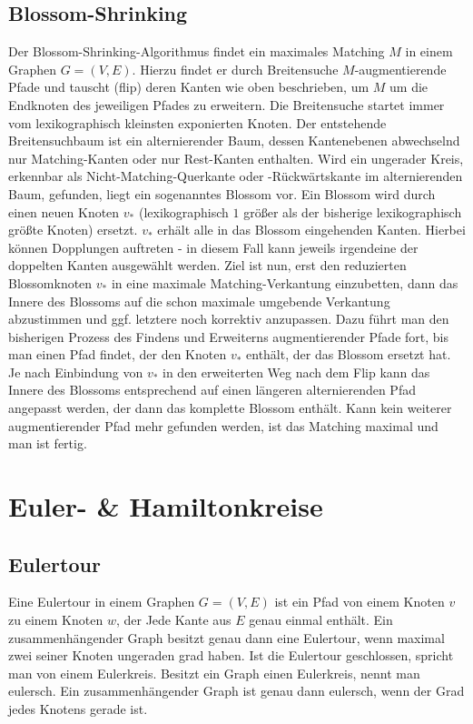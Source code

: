 \documentclass[10pt,a4paper,landscape]{article}
\begin{document}
\begin{multicols*}{2}
    \subsection{ Blossom-Shrinking }
    Der Blossom-Shrinking-Algorithmus findet ein maximales Matching $M$ in einem Graphen $G=(V,E)$. Hierzu findet er durch Breitensuche $M$-augmentierende Pfade 
    und tauscht (flip) deren Kanten wie oben beschrieben, um $M$ um die Endknoten des jeweiligen Pfades zu erweitern.
    \newline
    Die Breitensuche startet immer vom lexikographisch kleinsten exponierten Knoten. Der entstehende Breitensuchbaum ist ein alternierender Baum, 
    dessen Kantenebenen abwechselnd nur Matching-Kanten oder nur Rest-Kanten enthalten.
    \newline
    Wird ein ungerader Kreis, erkennbar als Nicht-Matching-Querkante oder -Rückwärtskante im alternierenden Baum, gefunden, liegt ein sogenanntes Blossom vor. Ein Blossom wird durch einen 
    neuen Knoten $v_*$ (lexikographisch $1$ größer als der bisherige lexikographisch größte Knoten) ersetzt. $v_*$ erhält alle in das Blossom eingehenden Kanten. 
    Hierbei können Dopplungen auftreten - in diesem Fall kann jeweils irgendeine der doppelten Kanten ausgewählt werden.
    \newline
    Ziel ist nun, erst den reduzierten Blossomknoten $v_*$ in eine maximale Matching-Verkantung einzubetten, dann das Innere des Blossoms auf die schon maximale
    umgebende Verkantung abzustimmen und ggf. letztere noch korrektiv anzupassen. Dazu führt man den bisherigen Prozess des Findens und Erweiterns augmentierender 
    Pfade fort, bis man einen Pfad findet, der den Knoten $v_*$ enthält, der das Blossom ersetzt hat. Je nach Einbindung von $v_*$ in den erweiterten Weg nach 
    dem Flip kann das Innere des Blossoms entsprechend auf einen längeren alternierenden Pfad angepasst werden, der dann das komplette Blossom enthält.
    \newline
    Kann kein weiterer augmentierender Pfad mehr gefunden werden, ist das Matching maximal und man ist fertig.

\section{ Euler- \& Hamiltonkreise }
    \subsection*{ Eulertour }
    Eine Eulertour in einem Graphen $G = (V,E)$ ist ein Pfad von einem Knoten $v$ zu einem Knoten $w$, der Jede Kante aus $E$ genau einmal enthält. 
    Ein zusammenhängender Graph besitzt genau dann eine Eulertour, wenn maximal zwei seiner Knoten ungeraden grad haben.
    \newline
    Ist die Eulertour geschlossen, spricht man von einem Eulerkreis. Besitzt ein Graph einen Eulerkreis, nennt man eulersch. Ein zusammenhängender Graph ist 
    genau dann eulersch, wenn der Grad jedes Knotens gerade ist.


\end{multicols*}
\end{document}
